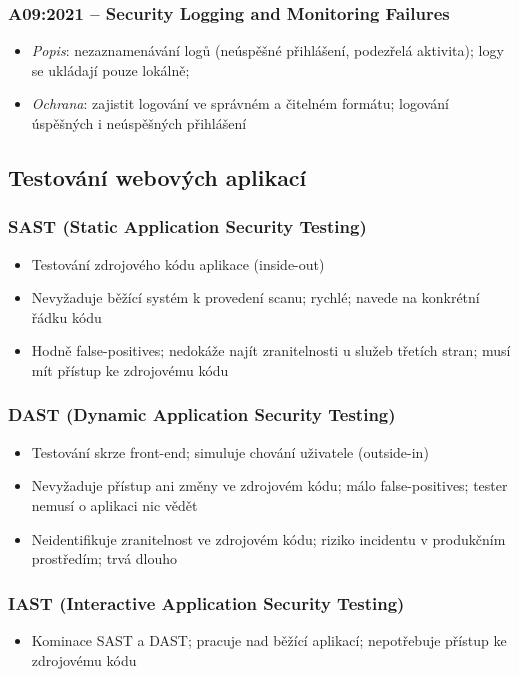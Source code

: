 \documentclass[10pt,a4paper]{article}
\begin{document}
\subsubsection*{A09:2021 – Security Logging and Monitoring Failures}
\begin{itemize}
    \item \textit{Popis}: nezaznamenávání logů (neúspěšné přihlášení, podezřelá aktivita); logy se ukládají pouze lokálně; 
    \item \textit{Ochrana}: zajistit logování ve správném a čitelném formátu; logování úspěšných i neúspěšných přihlášení
\end{itemize}

\subsection{Testování webových aplikací}

\subsubsection*{SAST (Static Application Security Testing)}
\begin{itemize}
    \item Testování zdrojového kódu aplikace (inside-out)
    \item Nevyžaduje běžící systém k provedení scanu; rychlé; navede na konkrétní řádku kódu
    \item Hodně false-positives; nedokáže najít zranitelnosti u služeb třetích stran; musí mít přístup ke zdrojovému kódu
\end{itemize}

\subsubsection*{DAST (Dynamic Application Security Testing)}
\begin{itemize}
    \item Testování skrze front-end; simuluje chování uživatele (outside-in)
    \item Nevyžaduje přístup ani změny ve zdrojovém kódu; málo false-positives; tester nemusí o aplikaci nic vědět
    \item Neidentifikuje zranitelnost ve zdrojovém kódu; riziko incidentu v produkčním prostředím; trvá dlouho
\end{itemize}

\subsubsection*{IAST (Interactive Application Security Testing)}
\begin{itemize}
    \item Kominace SAST a DAST; pracuje nad běžící aplikací; nepotřebuje přístup ke zdrojovému kódu
\end{itemize}
\end{document}
